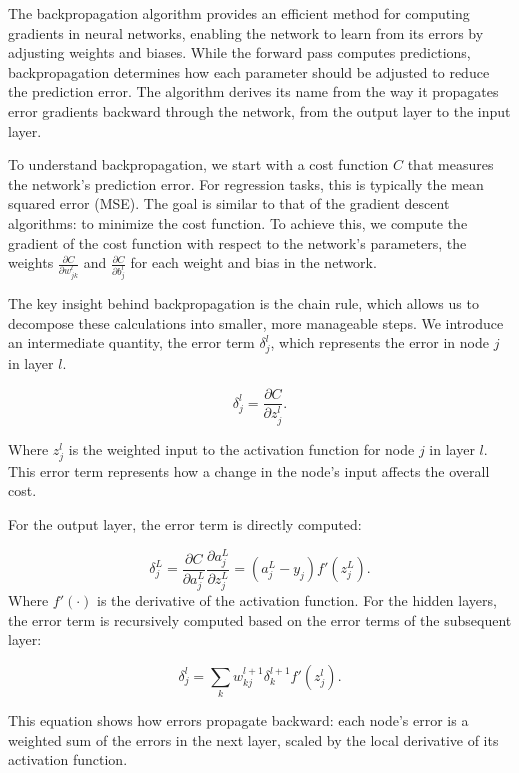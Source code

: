 \documentclass[aps,pra,english,notitlepage,reprint,nofootinbib]{revtex4-1}  %
\begin{document}
The backpropagation algorithm provides an efficient method for computing gradients in neural networks, enabling the network to learn from its errors by adjusting weights and biases. While the forward pass computes predictions, backpropagation determines how each parameter should be adjusted to reduce the prediction error. The algorithm derives its name from the way it propagates error gradients backward through the network, from the output layer to the input layer.

To understand backpropagation, we start with a cost function \( C \) that measures the network's prediction error. For regression tasks, this is typically the mean squared error (MSE). The goal is similar to that of the gradient descent algorithms: to minimize the cost function. To achieve this, we compute the gradient of the cost function with respect to the network's parameters, the weights \( \frac{\partial C}{\partial w_{jk}^l} \) and \( \frac{\partial C}{\partial b_j^l} \) for each weight and bias in the network.

The key insight behind backpropagation is the chain rule, which allows us to decompose these calculations into smaller, more manageable steps. We introduce an intermediate quantity, the error term \( \delta_j^l \), which represents the error in node \( j \) in layer \( l \).

\begin{equation}
    \delta_j^l = \frac{\partial C}{\partial z_j^l}.
\end{equation}

Where \( z_j^l \) is the weighted input to the activation function for node \( j \) in layer \( l \). This error term represents how a change in the node's input affects the overall cost.

For the output layer, the error term is directly computed:

\begin{equation}
    \delta_j^L = \frac{\partial C}{\partial a_j^L}\frac{\partial a_j^L}{\partial z_j^L} = (a_j^L - y_j)f'(z_j^L).
\end{equation}
Where \( f'(\cdot) \) is the derivative of the activation function. For the hidden layers, the error term is recursively computed based on the error terms of the subsequent layer:

\begin{equation}
    \delta_j^l = \sum_k w_{kj}^{l+1}\delta_k^{l+1}f'(z_j^l).
\end{equation}

This equation shows how errors propagate backward: each node's error is a weighted sum of the errors in the next layer, scaled by the local derivative of its activation function.
\end{document}
